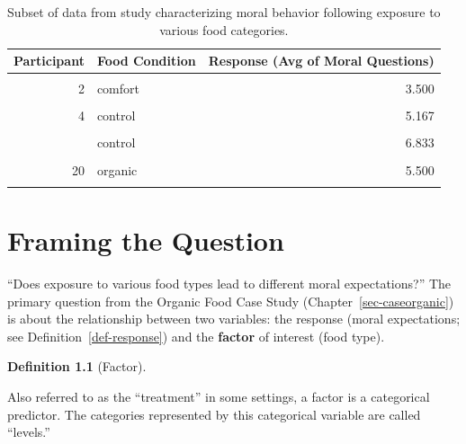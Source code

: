 \documentclass[
  letterpaper,
  DIV=11,
  numbers=noendperiod]{scrreprt}
\theoremstyle{definition}
\newtheorem{definition}{Definition}[chapter]
\theoremstyle{definition}
\theoremstyle{plain}
\theoremstyle{remark}
\begin{document}
\hypertarget{tbl-caseorganic-table}{}
\begin{table}
\caption{\label{tbl-caseorganic-table}Subset of data from study characterizing moral behavior following
exposure to various food categories. }\tabularnewline

\centering
\begin{tabular}[t]{rlr}
\toprule
Participant & Food Condition & Response (Avg of Moral Questions)\\
\midrule
\cellcolor{gray!6}{1} & \cellcolor{gray!6}{comfort} & \cellcolor{gray!6}{6.000}\\
2 & comfort & 3.500\\
\cellcolor{gray!6}{3} & \cellcolor{gray!6}{comfort} & \cellcolor{gray!6}{6.167}\\
4 & control & 5.167\\
\cellcolor{gray!6}{10} & \cellcolor{gray!6}{control} & \cellcolor{gray!6}{7.000}\\
\addlinespace
12 & control & 6.833\\
\cellcolor{gray!6}{18} & \cellcolor{gray!6}{organic} & \cellcolor{gray!6}{5.500}\\
20 & organic & 5.500\\
\cellcolor{gray!6}{21} & \cellcolor{gray!6}{organic} & \cellcolor{gray!6}{6.333}\\
\bottomrule
\end{tabular}
\end{table}

\hypertarget{sec-anovaquestions}{%
\chapter{Framing the Question}\label{sec-anovaquestions}}

``Does exposure to various food types lead to different moral
expectations?'' The primary question from the Organic Food Case Study
(Chapter~\ref{sec-caseorganic}) is about the relationship between two
variables: the response (moral expectations; see
Definition~\ref{def-response}) and the \textbf{factor} of interest (food
type).

\begin{definition}[Factor]\protect\hypertarget{def-factor}{}\label{def-factor}

Also referred to as the ``treatment'' in some settings, a factor is a
categorical predictor. The categories represented by this categorical
variable are called ``levels.''

\end{definition}
\end{document}
